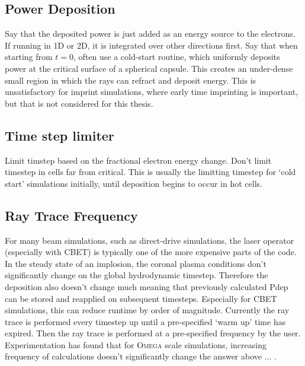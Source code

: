 \subsection{Power Deposition}

Say that the deposited power is just added as an energy source to the electrons.
If running in 1D or 2D, it is integrated over other directions first.
Say that when starting from $t=0$, often use a cold-start routine, which uniformly deposits power at the critical surface of a spherical capsule.
This creates an under-dense small region in which the rays can refract and deposit energy.
This is unsatisfactory for imprint simulations, where early time imprinting is important, but that is not considered for this thesis.

\subsection{Time step limiter} \label{dtlaser}

Limit timstep based on the fractional electron energy change.
Don't limit timestep in cells far from critical.
This is usually the limitting timestep for `cold start' simulations initially, until deposition begins to occur in hot cells.

\subsection{Ray Trace Frequency}

For many beam simulations, such as direct-drive simulations, the laser operator (especially with CBET) is typically one of the more expensive parts of the code.
In the steady state of an implosion, the coronal plasma conditions don't significantly change on the global hydrodynamic timestep.
Therefore the deposition also doesn't change much meaning that previously calculated Pdep can be stored and reapplied on subsequent timesteps.
Especially for CBET simulations, this can reduce runtime by order of magnitude.
Currently the ray trace is performed every timestep up until a pre-specified `warm up' time has expired.
Then the ray trace is performed at a pre-specified frequency by the user.
Experimentation has found that for \textsc{Omega} scale simulations, increasing frequency of calculations doesn't significantly change the answer above ... .

